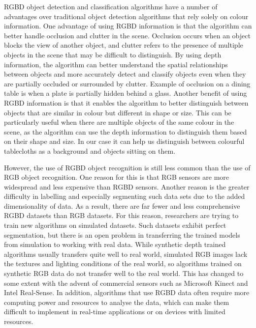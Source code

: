 \documentclass[10pt,twocolumn,letterpaper]{article}
\begin{document}
RGBD object detection and classification algorithms have a number of advantages over traditional object detection algorithms that rely solely on colour information\cite{Rosin_Lai_Shao_Liu_2019}. One advantage of using RGBD information is that the algorithm can better handle occlusion and clutter in the scene. Occlusion occurs when an object blocks the view of another object, and clutter refers to the presence of multiple objects in the scene that may be difficult to distinguish. By using depth information, the algorithm can better understand the spatial relationships between objects and more accurately detect and classify objects even when they are partially occluded or surrounded by clutter. Example of occlusion on a dining table is when a plate is partially hidden behind a glass. Another benefit of using RGBD information is that it enables the algorithm to better distinguish between objects that are similar in colour but different in shape or size. This can be particularly useful when there are multiple objects of the same colour in the scene, as the algorithm can use the depth information to distinguish them based on their shape and size. In our case it can help us distinguish between colourful tablecloths as a background and objects sitting on them. 

However, the use of RGBD object recognition is still less common than the use of RGB object recognition. One reason for this is that RGB sensors are more widespread and less expensive than RGBD sensors. Another reason is the greater difficulty in labelling and especially segmenting such data sets due to the added dimensionality of data. As a result, there are far fewer and less comprehensive RGBD datasets than RGB datasets. For this reason, researchers are trying to train new algorithms on simulated datasets. Such datasets exhibit perfect segmentation, but there is an open problem in transferring the trained models from simulation to working with real data. While synthetic depth trained algorithms usually transfers quite well to real world, simulated RGB images lack the textures and lighting conditions of the real world, so algorithms trained on synthetic RGB data do not transfer well to the real world. This has changed to some extent with the advent of commercial sensors such as Microsoft Kinect and Intel Real-Sense. In addition, algorithms that use RGBD data often require more computing power and resources to analyse the data, which can make them difficult to implement in real-time applications or on devices with limited resources.
\end{document}
